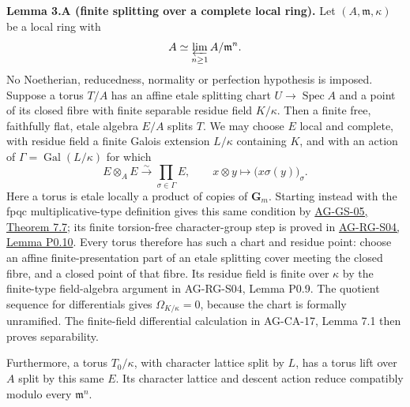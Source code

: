 \documentclass[11pt,a4paper,openany]{report}
\begin{document}
\textbf{Lemma 3.A (finite splitting over a complete local ring).} Let \((A,\mathfrak m,\kappa)\) be a local ring with \[
A\simeq\varprojlim_{n\geq1}A/\mathfrak m^n.
\] No Noetherian, reducedness, normality or perfection hypothesis is imposed. Suppose a torus \(T/A\) has an affine etale splitting chart \(U\to\operatorname{Spec}A\) and a point of its closed fibre with finite separable residue field \(K/\kappa\). Then a finite free, faithfully flat, etale algebra \(E/A\) splits \(T\). We may choose \(E\) local and complete, with residue field a finite Galois extension \(L/\kappa\) containing \(K\), and with an action of \(\Gamma=\operatorname{Gal}(L/\kappa)\) for which \[
E\otimes_AE\xrightarrow{\sim}\prod_{\sigma\in\Gamma}E,
\qquad x\otimes y\longmapsto\bigl(x\sigma(y)\bigr)_\sigma.
\tag{3.2}
\] Here a torus is etale locally a product of copies of \(\mathbf G_m\). Starting instead with the fpqc multiplicative-type definition gives this same condition by \href{https://github.com/KokunoYumeto/open-math-courses/blob/d02d0a3669f42579db037cd44de1d113fdd770a1/docs/courses/AG-GS/src/diagonalizable-groups.md}{AG-GS-05, Theorem 7.7}; its finite torsion-free character-group step is proved in \href{https://github.com/KokunoYumeto/open-math-courses/blob/main/docs/courses/AG-RG/AG-RG-S04.md\#finite-torsion-free-lattices}{AG-RG-S04, Lemma P0.10}. Every torus therefore has such a chart and residue point: choose an affine finite-presentation part of an etale splitting cover meeting the closed fibre, and a closed point of that fibre. Its residue field is finite over \(\kappa\) by the finite-type field-algebra argument in AG-RG-S04, Lemma P0.9. The quotient sequence for differentials gives \(\Omega_{K/\kappa}=0\), because the chart is formally unramified. The finite-field differential calculation in AG-CA-17, Lemma 7.1 then proves separability.

Furthermore, a torus \(T_0/\kappa\), with character lattice split by \(L\), has a torus lift over \(A\) split by this same \(E\). Its character lattice and descent action reduce compatibly modulo every \(\mathfrak m^n\).
\end{document}
